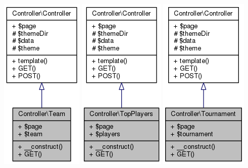 \documentclass[11pt]{article}
\begin{document}
\includegraphics[scale=0.4]{UML_Controller_1_1Team.png}
\includegraphics[scale=0.4]{UML_Controller_1_1TopPlayers.png}
\includegraphics[scale=0.4]{UML_Controller_1_1Tournament.png}
\end{document}
